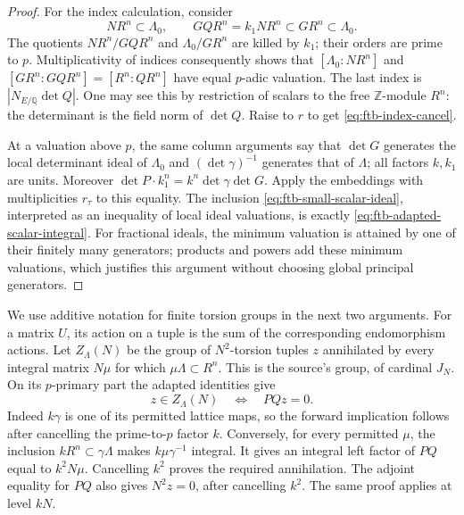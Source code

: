 \begin{proof}
For the index calculation, consider
\[
 NR^n\subset\Lambda_0,\qquad
 GQR^n=k_1NR^n\subset GR^n\subset\Lambda_0 .
\]
The quotients
\(NR^n/GQR^n\) and \(\Lambda_0/GR^n\) are killed by \(k_1\);
their orders are prime to \(p\).
Multiplicativity of indices consequently shows that
\([\Lambda_0:NR^n]\) and
\([GR^n:GQR^n]=[R^n:QR^n]\) have equal \(p\)-adic valuation.
The last index is \(|N_{E/\mathbb Q}\det Q|\).
One may see this by restriction of scalars to the free
\(\mathbb Z\)-module \(R^n\): the determinant is the field norm of
\(\det Q\).  Raise to \(r\) to get \eqref{eq:ftb-index-cancel}.

At a valuation above \(p\), the same column arguments say that
\(\det G\) generates the local determinant ideal of \(\Lambda_0\)
and \((\det\gamma)^{-1}\) generates that of \(\Lambda\);
all factors \(k,k_1\) are units.
Moreover
\(\det P\cdot k_1^n=k^n\det\gamma\det G\).
Apply the embeddings with multiplicities \(r_\tau\) to this equality.
The inclusion \eqref{eq:ftb-small-scalar-ideal}, interpreted as an
inequality of local ideal valuations, is exactly
\eqref{eq:ftb-adapted-scalar-integral}.
For fractional ideals, the minimum valuation is attained by one
of their finitely many generators; products and powers add these
minimum valuations, which justifies this argument without choosing
global principal generators.
\end{proof}

We use additive notation for finite torsion groups in the next two
arguments.  For a matrix \(U\), its action on a tuple is the sum of
the corresponding endomorphism actions.
Let \(Z_\Lambda(N)\) be the group of \(N^2\)-torsion tuples \(z\)
annihilated by every integral matrix \(N\mu\) for which
\(\mu\Lambda\subset R^n\).
This is the source's  group, of cardinal \(J_N\).
On its \(p\)-primary part the adapted identities give
\begin{equation}\label{eq:ftb-primary-adapted-kernel}
                z\in Z_\Lambda(N)\quad\Longleftrightarrow\quad PQz=0 .
\end{equation}
Indeed \(k\gamma\) is one of its permitted lattice maps, so the
forward implication follows after cancelling the prime-to-\(p\)
factor \(k\).
Conversely, for every permitted \(\mu\), the inclusion
\(kR^n\subset\gamma\Lambda\) makes
\(k\mu\gamma^{-1}\) integral.
It gives an integral left factor of \(PQ\) equal to \(k^2N\mu\).
Cancelling \(k^2\) proves the required annihilation.
The adjoint equality for \(PQ\) also gives \(N^2z=0\), after
cancelling \(k^2\).
The same proof applies at level \(kN\).

